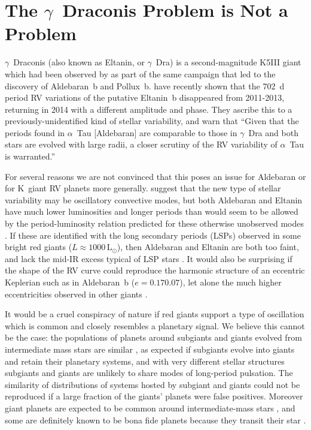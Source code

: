 \documentclass[modern]{aastex61}
\newcommand{\lsun}{\mbox{$\mathrm{L}_{\odot}$}\xspace}
\newcommand{\twosidedrange}[3]{\ensuremath{#1^{+#2}_{-#3}}}
\newcommand{\EccentricityRange}{0.17$\pm$0.07} %
\begin{document}
\section{The $\gamma$~Draconis Problem is Not a Problem}
\label{gamma_dra}

$\gamma$~Draconis (also known as Eltanin, or $\gamma$~Dra) is a second-magnitude K5III giant which had been observed by \citet{hatzes1993} as part of the same campaign that led to the discovery of Aldebaran~b and Pollux~b. \citet{2018arXiv180105239H} have recently shown that the 702~d period RV variations of the putative Eltanin~b disappeared from 2011-2013, returning in 2014 with a different amplitude and phase. They ascribe this to a previously-unidentified kind of stellar variability, and warn that ``Given that the periods found in $\alpha$~Tau [Aldebaran] are comparable to those in $\gamma$~Dra and both stars are evolved with large radii, a closer scrutiny of the RV variability of $\alpha$~Tau is warranted.''

For several reasons we are not convinced that this poses an issue for Aldebaran or for K~giant RV planets more generally. \citet{2018arXiv180105239H} suggest that the new type of stellar variability may be oscillatory convective modes, but both Aldebaran and Eltanin have much lower luminosities and longer periods than would seem to be allowed by the period-luminosity relation predicted for these otherwise unobserved modes \citep[Figure~9]{2015MNRAS.452.3863S,2018arXiv180105239H}. If these are identified with the long secondary periods (LSPs) observed in some bright red giants ($L \approx 1000\, \lsun$), then Aldebaran and Eltanin are both too faint, and lack the mid-IR excess typical of LSP stars \citep{2009ApJ...707..573W}. It would also be surprising if the shape of the RV curve could reproduce the harmonic structure of an eccentric Keplerian such as in Aldebaran~b ($e = \EccentricityRange{}$), let alone the much higher eccentricities observed in other giants \citep[e.g. $\iota$~Dra~b, $e=0.7$:][]{2002ApJ...576..478F}.

It would be a cruel conspiracy of nature if red giants support a type of oscillation which is common and closely resembles a planetary signal. We believe this cannot be the case: the populations of planets around subgiants and giants evolved from intermediate mass stars are similar \citep{2014A&A...566A.113J}, as expected if subgiants evolve into giants and retain their planetary systems, and with very different stellar structures subgiants and giants are unlikely to share modes of long-period pulsation. The similarity of distributions of systems hosted by subgiant and giants could not be reproduced if a large fraction of the giants' planets were false positives. Moreover giant planets are expected to be common around intermediate-mass stars \citep{2008ApJ...673..502K}, and some are definitely known to be bona fide planets because they transit their star \citep[e.g.][]{2014A&A...562A.109L,2015A&A...573L...6O,2016AJ....152..185G,2017AJ....154..254G}.
\end{document}
